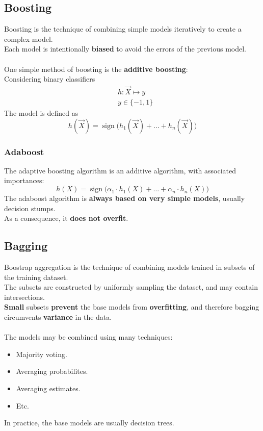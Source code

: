 \documentclass[11pt]{article}
\DeclareMathOperator{\sign}{sign}
\begin{document}
\subsection{Boosting}
\label{sec:orgb20c438}
Boosting is the technique of combining simple models iteratively to create a complex
model. \\
Each model is intentionally \textbf{biased} to avoid the errors of the previous model.
\\ \\
One simple method of boosting is the \textbf{additive boosting}: \\
Considering binary classifiers
\begin{align*}
  & h: \vec{X} \mapsto y \\
  & y \in \{ -1, 1 \}
\end{align*}
The model is defined as
\[
h(\vec{X}) = \sign\big(h_1(\vec{X}) + \hdots + h_n(\vec{X})\big)
\]
\subsubsection{Adaboost}
\label{sec:org8b5638a}
The adaptive boosting algorithm is an additive algorithm, with associated importances:
\[
  h(X) = \sign\big(\alpha_1 \cdot h_1(X) + \hdots + \alpha_n \cdot h_n(X)\big)
\]
The adaboost algorithm is \textbf{always based on very simple models}, usually decision
stumps. \\
As a consequence, it \textbf{does not overfit}.
\subsection{Bagging}
\label{sec:orged354a6}
Boostrap aggregation is the technique of combining models trained in subsets of the
training dataset. \\
The subsets are constructed by uniformly sampling the dataset, and may contain
intersections. \\
\textbf{Small} subsets \textbf{prevent} the base models from \textbf{overfitting}, and therefore bagging
circumvents \textbf{variance} in the data. \\ \\
The models may be combined using many techniques:
\begin{itemize}[itemsep=0pt]
\item Majority voting.
\item Averaging probabilites.
\item Averaging estimates.
\item Etc.
\end{itemize}
In practice, the base models are usually decision trees.
\end{document}

